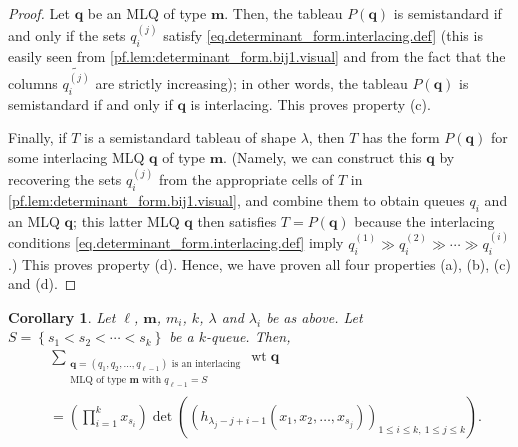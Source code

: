 \documentclass[reqno]{amsart}%
\newcommand{\0}{\phantom{c}}
\let\sumnonlimits\sum
\let\prodnonlimits\prod
\renewcommand{\sum}{\sumnonlimits\limits}
\renewcommand{\prod}{\prodnonlimits\limits}
\theoremstyle{plain}
\newtheorem{cor}[thm]{Corollary}
\theoremstyle{definition}
\numberwithin{equation}{section}
\begin{document}
\begin{proof}
Let $\mathbf{q}$ be an MLQ of type $\mathbf{m}$. Then, the tableau $P\left(
\mathbf{q}\right)  $ is semistandard if and only if the sets $q_{i}^{\left(
j\right)  }$ satisfy \eqref{eq.determinant_form.interlacing.def} (this is
easily seen from \eqref{pf.lem:determinant_form.bij1.visual} and from the fact
that the columns $\widetilde{q_{i}^{\left(  j\right)  }}$ are strictly
increasing); in other words, the tableau $P\left(  \mathbf{q}\right)  $ is
semistandard if and only if $\mathbf{q}$ is interlacing. This proves property (c).

Finally, if $T$ is a semistandard tableau of shape $\lambda$, then $T$ has the
form $P\left(  \mathbf{q}\right)  $ for some interlacing MLQ $\mathbf{q}$ of
type $\mathbf{m}$. (Namely, we can construct this $\mathbf{q}$ by recovering
the sets $q_{i}^{\left(  j\right)  }$ from the appropriate cells of $T$ in
\eqref{pf.lem:determinant_form.bij1.visual}, and combine them to obtain queues
$q_{i}$ and an MLQ $\mathbf{q}$; this latter MLQ $\mathbf{q}$ then satisfies
$T=P\left(  \mathbf{q}\right)  $ because the interlacing conditions
\eqref{eq.determinant_form.interlacing.def} imply $q_{i}^{\left(  1\right)
}\gg q_{i}^{\left(  2\right)  }\gg\cdots\gg q_{i}^{\left(  i\right)  }$.) This
proves property (d). Hence, we have proven all four properties (a), (b), (c)
and (d).
\end{proof}

\begin{cor}
\label{cor:determinant_form.bij1c} Let $\ell$, $\mathbf{m}$, $m_{i}$, $k$,
$\lambda$ and $\lambda_{i}$ be as above. Let $S=\left\{  s_{1}<s_{2}%
<\cdots<s_{k}\right\}  $ be a $k$-queue. Then,%
\begin{align*}
&  \sum_{\substack{\mathbf{q}=\left(  q_{1},q_{2},\ldots,q_{\ell-1}\right)
\text{ is an interlacing}\\\text{MLQ of type }\mathbf{m}\text{ with }%
q_{\ell-1}=S}}\operatorname*{wt}\mathbf{q}\\
&  =\left(  \prod_{i=1}^{k}x_{s_{i}}\right)  \det\left(  \left(
h_{\lambda_{j}-j+i-1}\left(  x_{1},x_{2},\ldots,x_{s_{j}}\right)  \right)
_{1\leq i\leq k,\ 1\leq j\leq k}\right)  .
\end{align*}

\end{cor}
\end{document}
